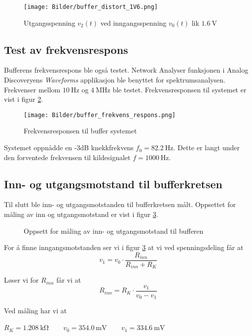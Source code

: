 \begin{figure}[H]
    \centering 
    \texttt{[image: Bilder/buffer\_distort\_1V6.png]}
    \caption{Utgangsspenning $v_2(t)$ ved inngangsspenning $v_0(t)$ lik $\SI{1.6}{\volt}$}
    \label{fig:buffer_disturb_850mv_plot}
\end{figure}

\subsection{Test av frekvensrespons}
Bufferens frekvensrespons ble også testet. Network Analyser funksjonen i 
Analog Discoveryens \textit{Waveforms} applikasjon ble benyttet for spektrumsanalysen. Frekvenser mellom
$\SI{10}{\hertz}$ og $\SI{4}{\mega\hertz}$ ble testet. Frekvensresponsen til systemet er vist i figur \ref{fig:buffer_frekvens_respons}.
\begin{figure}[H]
    \centering 
    \texttt{[image: Bilder/buffer\_frekvens\_respons.png]}
    \caption{Frekvensresponsen til buffer systemet}
    \label{fig:buffer_frekvens_respons}
\end{figure}

Systemet oppnådde en -3dB knekkfrekvens $f_0 = \SI{82.2}{\hertz}$. Dette er langt under den forventede 
frekvensen til kildesignalet $f = \SI{1000}{\hertz}$.

\subsection{Inn- og utgangsmotstand til bufferkretsen}
Til slutt ble inn- og utgangsmotstanden til bufferkretsen målt. Oppsettet for måling av inn og utgangsmotstand 
er vist i figur \ref{fig:in_out_res_measure_setup}.

\begin{figure}[H]
    \centering
    \caption{Oppsett for måling av inn- og utgangsmotstand til bufferen}
    \label{fig:in_out_res_measure_setup}
\end{figure}

For å finne inngangsmotstanden ser vi i figur \ref{fig:in_out_res_measure_setup} at vi ved spenningsdeling
får at 
\[
    v_1 = v_0 \cdot \frac{R_{inn}}{R_{inn} + R_K}
\]

Løser vi for $R_{inn}$ får vi at 
\[
    R_{inn} = R_K \cdot \frac{v_1}{v_0 - v_1}
\]

Ved måling har vi at
\begin{center}
    $R_K = \SI{1.208}{\kilo\ohm}\:\:\:\:$ $\:\:\:\:v_0 = \SI{354.0}{\milli\volt}\:\:\:\:$ $\:\:\:\:v_1 = \SI{334.6}{\milli\volt}$
\end{center}

